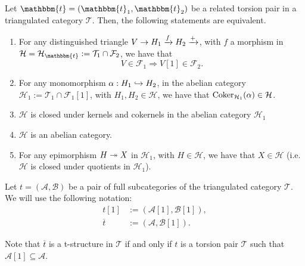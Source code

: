 \begin{thm}\label{thm:2.9}
  Let $\mathbbm{t}=(\mathbbm{t}_1,\mathbbm{t}_2)$ be a related torsion pair in a triangulated
  category $\mathcal{T}$. Then, the following statements are equivalent.
  \begin{enumerate}[label=(\alph*)]
    \item For any distinguished triangle $V\to H_1\xrightarrow{f}H_2\xrightarrow{+}$, with
      $f$ a morphism in $\mathcal{H}=\mathcal{H}_\mathbbm{t}:=\mathcal{T}_1\cap\mathcal{F}_2$,
      we have that
      \begin{equation*}
        V\in\mathcal{F}_1 \Rightarrow V[1]\in\mathcal{F}_2.
      \end{equation*}
    \item For any monomorphism $\alpha:H_1\hookrightarrow H_2$, in the abelian category
      $\mathcal{H}_1:=\mathcal{T}_1\cap\mathcal{F}_1[1]$, with $H_1,H_2\in\mathcal{H}$,
      we have that $\operatorname{Coker}_{\mathcal{H}_1}(\alpha)\in\mathcal{H}$.
    \item $\mathcal{H}$ is closed under kernels and cokernels in the abelian category
      $\mathcal{H}_1$
    \item $\mathcal{H}$ is an abelian category.
    \item For any epimorphism $H\twoheadrightarrow X$ in $\mathcal{H}_1$, with $H\in\mathcal{H}$,
      we have that $X\in\mathcal{H}$ (i.e. $\mathcal{H}$ is closed under quotients in $\mathcal{H}_1$).
  \end{enumerate}
\end{thm}

Let $t=(\mathcal{A},\mathcal{B})$ be a pair of full subcategories of the triangulated
category $\mathcal{T}$. We will use the following notation:
\begin{align*}
  t[1] &:= (\mathcal{A}[1],\mathcal{B}[1]),\\
  \overline{t} &:= (\mathcal{A},\mathcal{B}[1]).
\end{align*}

Note that $\overline{t}$ is a t-structure in $\mathcal{T}$ if and only if $t$ is a torsion
pair $\mathcal{T}$ such that $\mathcal{A}[1]\subseteq\mathcal{A}$.

